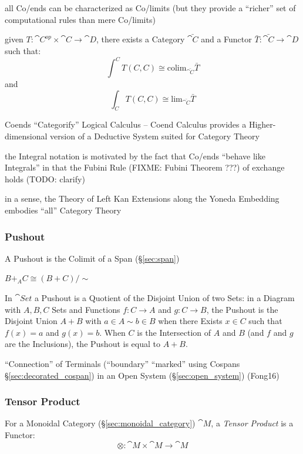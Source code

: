 all Co/ends can be characterized as Co/limits (but they provide a ``richer'' set
of computational rules than mere Co/limits)

given $T : \cat{C}^{op} \times \cat{C} \to \cat{D}$, there exists a Category
$\bar{\cat{C}}$ and a Functor $\bar{T} : \bar{\cat{C}} \to \cat{D}$ such that:
\[
  \int^C T(C,C) \cong \mathrm{colim}_\bar{\cat{C}}\bar{T}
\]
and
\[
  \int_C T(C,C) \cong \mathrm{lim}_\bar{\cat{C}}\bar{T}
\]

Coends ``Categorify'' Logical Calculus -- Coend Calculus provides a
Higher-dimensional version of a Deductive System suited for Category Theory

the Integral notation is motivated by the fact that Co/ends ``behave like
Integrals'' in that the Fubini Rule (FIXME: Fubini Theorem ???) of exchange
holds (TODO: clarify)

in a sense, the Theory of Left Kan Extensions along the Yoneda Embedding
embodies ``all'' Category Theory



\subsubsection{Pushout}\label{sec:pushout}

A Pushout is the Colimit of a Span (\S\ref{sec:span})

$B +_A C \cong (B + C)/\sim$

In $\cat{Set}$ a Pushout is a Quotient of the Disjoint Union of two
Sets: in a Diagram with $A,B,C$ Sets and Functions $f : C \rightarrow
A$ and $g : C \rightarrow B$, the Pushout is the Disjoint Union $A +
B$ with $a \in A \sim b \in B$ when there Exists $x \in C$ such that
$f(x) = a$ and $g(x) = b$. When $C$ is the Intersection of $A$ and $B$
(and $f$ and $g$ are the Inclusions), the Pushout is equal to $A + B$.

\fist ``Connection'' of Terminals (``boundary'' ``marked'' using
Cospans \S\ref{sec:decorated_cospan}) in an Open System
(\S\ref{sec:open_system}) (Fong16)



\subsubsection{Tensor Product}\label{sec:tensor_product}

For a Monoidal Category (\S\ref{sec:monoidal_category}) $\cat{M}$,
a \emph{Tensor Product} is a Functor:
\[
  \otimes : \cat{M} \times \cat{M} \rightarrow \cat{M}
\]

